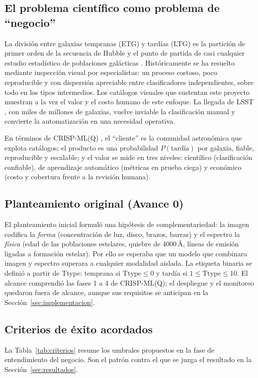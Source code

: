 \subsection{El problema científico como problema de ``negocio''}
La división entre galaxias tempranas (ETG) y tardías (LTG) es la partición de primer orden de la secuencia de Hubble y el punto de partida de casi cualquier estudio estadístico de poblaciones galácticas \citep{hubble1926,buta2013}. Históricamente se ha resuelto mediante inspección visual por especialistas: un proceso costoso, poco reproducible y con dispersión apreciable entre clasificadores independientes, sobre todo en los tipos intermedios. Los catálogos visuales que sustentan este proyecto \citep{nair2010,vazquezmata2022} muestran a la vez el valor y el costo humano de este enfoque. La llegada de LSST \citep{ivezic2019}, con miles de millones de galaxias, vuelve inviable la clasificación manual y convierte la automatización en una necesidad operativa.

En términos de CRISP-ML(Q) \citep{studer2021}, el ``cliente'' es la comunidad astronómica que explota catálogos; el producto es una probabilidad $P(\text{tardía})$ por galaxia, fiable, reproducible y escalable; y el valor se mide en tres niveles: científico (clasificación confiable), de aprendizaje automático (métricas en prueba ciega) y económico (costo y cobertura frente a la revisión humana).

\subsection{Planteamiento original (Avance 0)}
El planteamiento inicial formuló una hipótesis de complementariedad: la imagen codifica la \emph{forma} (concentración de luz, disco, brazos, barras) y el espectro la \emph{física} (edad de las poblaciones estelares, quiebre de 4000\,\AA, líneas de emisión ligadas a formación estelar). Por ello se esperaba que un modelo que combinara imagen y espectro superara a cualquier modalidad aislada. La etiqueta binaria se definió a partir de Ttype: temprana si $\text{Ttype}\leq 0$ y tardía si $1\leq\text{Ttype}\leq 10$. El alcance comprendió las fases 1 a 4 de CRISP-ML(Q); el despliegue y el monitoreo quedaron fuera de alcance, aunque sus requisitos se anticipan en la Sección~\ref{sec:implementacion}.

\subsection{Criterios de éxito acordados}
La Tabla~\ref{tab:criterios} resume los umbrales propuestos en la fase de entendimiento del negocio. Son el patrón contra el que se juzga el resultado en la Sección~\ref{sec:resultados}.

